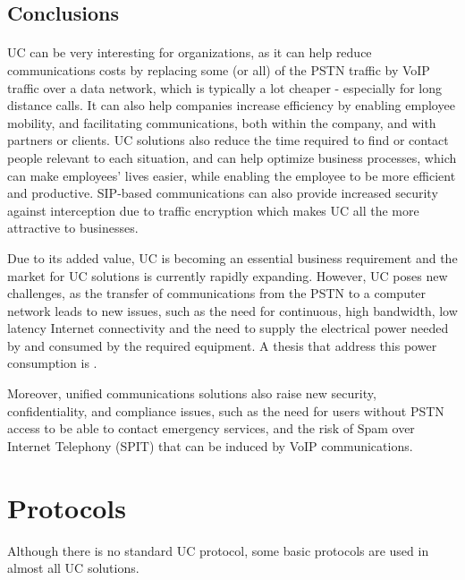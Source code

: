 \subsection{Conclusions}
\paragraph{}
UC can be very interesting for organizations, as it can help reduce communications costs by replacing some (or all) of the PSTN traffic by VoIP  traffic over a data network, which is typically a lot cheaper - especially for long distance calls. It can also help companies increase efficiency by enabling employee mobility, and facilitating communications, both within the company, and with partners or clients. UC solutions also reduce the time required to find or contact people relevant to each situation, and can help optimize business processes, which can make employees' lives easier, while enabling the employee to be more efficient and productive. SIP-based communications can also provide increased security against interception due to traffic encryption\cite{carrara_security_2005} which makes UC all the more attractive to businesses.

Due to its added value, UC is becoming an essential business requirement and the market for UC solutions is currently rapidly expanding.
However, UC poses new challenges, as the transfer of communications from the PSTN to a computer network leads to new issues, such as the need for continuous, high bandwidth, low latency Internet connectivity and the need to supply the electrical power needed by and consumed by the required equipment. A thesis that address this power consumption is \cite{talaganov_green_2012}.

Moreover, unified communications solutions also raise new security, confidentiality, and compliance issues, such as the need for users without PSTN access to be able to contact emergency services, and the risk of Spam over Internet Telephony (SPIT) that can be induced by VoIP communications\cite{desantis_understanding_2008}.


\section{Protocols}
Although there is no standard UC protocol, some basic protocols are used in almost all UC solutions. 

